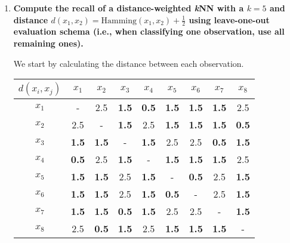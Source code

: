 \documentclass[12pt]{article}
\begin{document}
\begin{enumerate}[leftmargin=\labelsep]
    \item {\bfseries
          Compute the recall of a distance-weighted \textit{k}NN with a \(k=5\)
          and distance \(d(x_1,x_2)=\text{Hamming}(x_1,x_2)+\frac{1}{2}\) using
          leave-one-out evaluation schema (i.e., when classifying one observation,
          use all remaining ones).
          }\\
          \vspace{0.5em}

          We start by calculating the distance between each observation.

          \begin{center}
              \begin{tabular}{c|cccccccc}
                  \(d(x_i,x_j)\) & \(x_1\)      & \(x_2\)      & \(x_3\)      & \(x_4\)      & \(x_5\)      & \(x_6\)      & \(x_7\)      & \(x_8\)      \\
                  \hline
                  \(x_1\)        & -            & 2.5          & \textbf{1.5} & \textbf{0.5} & \textbf{1.5} & \textbf{1.5} & \textbf{1.5} & 2.5          \\
                  \(x_2\)        & 2.5          & -            & \textbf{1.5} & 2.5          & \textbf{1.5} & \textbf{1.5} & \textbf{1.5} & \textbf{0.5} \\
                  \(x_3\)        & \textbf{1.5} & \textbf{1.5} & -            & \textbf{1.5} & 2.5          & 2.5          & \textbf{0.5} & \textbf{1.5} \\
                  \(x_4\)        & \textbf{0.5} & 2.5          & \textbf{1.5} & -            & \textbf{1.5} & \textbf{1.5} & \textbf{1.5} & 2.5          \\
                  \(x_5\)        & \textbf{1.5} & \textbf{1.5} & 2.5          & \textbf{1.5} & -            & \textbf{0.5} & 2.5          & \textbf{1.5} \\
                  \(x_6\)        & \textbf{1.5} & \textbf{1.5} & 2.5          & \textbf{1.5} & \textbf{0.5} & -            & 2.5          & \textbf{1.5} \\
                  \(x_7\)        & \textbf{1.5} & \textbf{1.5} & \textbf{0.5} & \textbf{1.5} & 2.5          & 2.5          & -            & \textbf{1.5} \\
                  \(x_8\)        & 2.5          & \textbf{0.5} & \textbf{1.5} & 2.5          & \textbf{1.5} & \textbf{1.5} & \textbf{1.5} & -
              \end{tabular}
          \end{center}


\end{enumerate}
\end{document}

